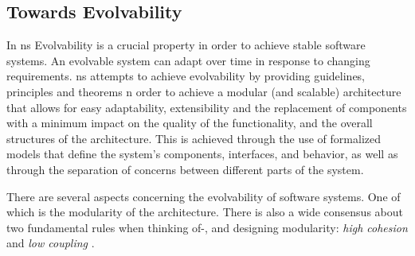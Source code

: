 \subsection{Towards Evolvability} \label{sec:on_evolvability}

In \gls{ns} Evolvability is a crucial property in order to achieve stable software
systems. An evolvable system can adapt over time in response to changing requirements.
\gls{ns} attempts to achieve evolvability by providing guidelines, principles and theorems
n order to achieve a modular (and scalable) architecture that allows for easy
adaptability, extensibility and the replacement of components with a minimum impact on the
quality of the functionality, and the overall structures of the architecture. This is
achieved through the use of formalized models that define the system's components,
interfaces, and behavior, as well as through the separation of concerns between different
parts of the system.

There are several aspects concerning the evolvability of software systems. One of which is
the modularity of the architecture. There is also a wide consensus about two fundamental
rules when thinking of-, and designing modularity: \emph{high cohesion} and \emph{low
coupling} \autocite[22]{mannaert_normalized_2016}.